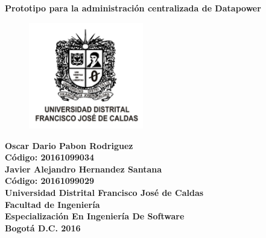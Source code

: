 \begin{titlepage}
	
	\begin{center}
		\textbf{Prototipo para la administración centralizada de Datapower}\\
		\vspace*{0.5in}
		\vspace*{1in}
		\begin{figure}[htb]
			\begin{center}
				\includegraphics[width=5cm]{./Imagenes/LogoUdistrital.png}
			\end{center}
		\end{figure}
		
		\textbf{Oscar Dario Pabon Rodriguez\\
				Código: 20161099034 \\
				Javier Alejandro Hernandez Santana\\
				Código: 20161099029 \\
				\vspace{2in}
				Universidad Distrital Francisco José de Caldas\\
				Facultad de Ingeniería\\
				Especialización En Ingeniería De Software\\
				Bogotá D.C. 2016	
				}
	\end{center}
\end{titlepage}